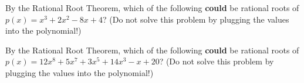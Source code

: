 \documentclass[nooutcomes]{ximera}
\begin{document}
\begin{problem}
By the Rational Root Theorem, which of the following \textbf{could} be rational roots of $p(x) = x^3 + 2x^2 - 8x + 4$?   
(Do not solve this problem by plugging the values into the polynomial!)
\begin{selectAll}
\end{selectAll}
\end{problem}




\begin{problem}
By the Rational Root Theorem, which of the following \textbf{could} be rational roots of $p(x) = 12x^8 + 5x^7 + 3x^5 + 14x^3 - x + 20$?
(Do not solve this problem by plugging the values into the polynomial!)
\begin{selectAll}
\end{selectAll}
\end{problem}


%
%
\end{document}
